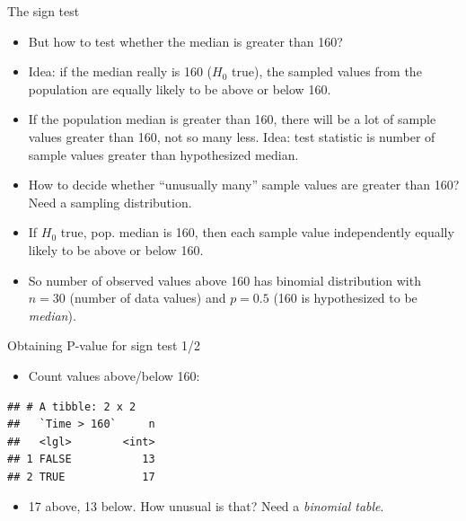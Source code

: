 \documentclass[ignorenonframetext,]{beamer}
\newenvironment{Shaded}{\begin{snugshade}}{\end{snugshade}}
\newcommand{\DecValTok}[1]{\textcolor[rgb]{0.00,0.00,0.81}{#1}}
\newcommand{\KeywordTok}[1]{\textcolor[rgb]{0.13,0.29,0.53}{\textbf{#1}}}
\newcommand{\NormalTok}[1]{#1}
\newcommand{\OperatorTok}[1]{\textcolor[rgb]{0.81,0.36,0.00}{\textbf{#1}}}
\newcommand{\StringTok}[1]{\textcolor[rgb]{0.31,0.60,0.02}{#1}}
\providecommand{\tightlist}{%
  \setlength{\itemsep}{0pt}\setlength{\parskip}{0pt}}
\begin{document}
\begin{frame}{The sign test}
\protect\hypertarget{the-sign-test}{}

\begin{itemize}
\tightlist
\item
  But how to test whether the median is greater than 160?
\item
  Idea: if the median really is 160 (\(H_0\) true), the sampled values
  from the population are equally likely to be above or below 160.
\item
  If the population median is greater than 160, there will be a lot of
  sample values greater than 160, not so many less. Idea: test statistic
  is number of sample values greater than hypothesized median.
\item
  How to decide whether ``unusually many'' sample values are greater
  than 160? Need a sampling distribution.
\item
  If \(H_0\) true, pop. median is 160, then each sample value
  independently equally likely to be above or below 160.
\item
  So number of observed values above 160 has binomial distribution with
  \(n = 30\) (number of data values) and \(p = 0.5\) (160 is
  hypothesized to be \emph{median}).
\end{itemize}

\end{frame}

\begin{frame}[fragile]{Obtaining P-value for sign test 1/2}
\protect\hypertarget{obtaining-p-value-for-sign-test-12}{}

\begin{itemize}
\tightlist
\item
  Count values above/below 160:
\end{itemize}

\begin{Shaded}
\end{Shaded}

\begin{verbatim}
## # A tibble: 2 x 2
##   `Time > 160`     n
##   <lgl>        <int>
## 1 FALSE           13
## 2 TRUE            17
\end{verbatim}

\begin{itemize}
\tightlist
\item
  17 above, 13 below. How unusual is that? Need a \emph{binomial table}.
\end{itemize}

\end{frame}
\end{document}

